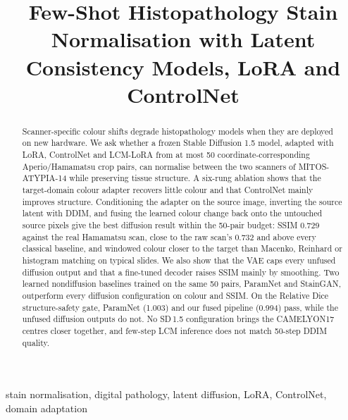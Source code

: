 \documentclass[conference]{IEEEtran}
\begin{document}
\title{Few-Shot Histopathology Stain Normalisation with Latent Consistency Models, LoRA and ControlNet}

\author{
}

\maketitle

\begin{abstract}
Scanner-specific colour shifts degrade histopathology models when they are deployed on new hardware.
We ask whether a frozen Stable Diffusion 1.5 model, adapted with LoRA, ControlNet and LCM-LoRA from at
most 50 coordinate-corresponding Aperio/Hamamatsu crop pairs, can normalise between the two scanners of
MITOS-ATYPIA-14 while preserving tissue structure. A six-rung ablation shows that the target-domain
colour adapter recovers little colour and that ControlNet mainly improves structure. Conditioning the
adapter on the source image, inverting the source latent with DDIM, and fusing the learned colour change
back onto the untouched source pixels give the best diffusion result within the 50-pair budget: SSIM 0.729 against
the real Hamamatsu scan, close to the raw scan's 0.732 and above every classical baseline, and windowed colour closer to the target than Macenko,
Reinhard or histogram matching on typical slides. We also show that the VAE caps every unfused diffusion output
and that a fine-tuned decoder raises SSIM mainly by smoothing. Two learned nondiffusion baselines
trained on the same 50 pairs, ParamNet and StainGAN, outperform every diffusion configuration on colour
and SSIM. On the Relative Dice structure-safety gate, ParamNet (1.003) and our fused pipeline (0.994)
pass, while the unfused diffusion outputs do not. No SD\,1.5 configuration brings the CAMELYON17 centres
closer together, and few-step LCM inference does not match 50-step DDIM quality.
\end{abstract}

\begin{IEEEkeywords}
stain normalisation, digital pathology, latent diffusion, LoRA, ControlNet, domain adaptation
\end{IEEEkeywords}











\clearpage
\appendices
\renewcommand{\dbltopfraction}{0.9}\renewcommand{\dblfloatpagefraction}{0.6}
\makeatletter\setlength{\@dblfptop}{0pt}\setlength{\@dblfpsep}{16pt plus 4pt}\setlength{\@dblfpbot}{0pt plus 1fil}\makeatother


\end{document}
